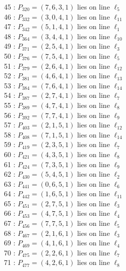 \documentclass{article}
\begin{document}
{\begin{multicols}{2}
45 : $P_{320}=( 7, 6, 3, 1 )$ lies on line $\ell_{5}$\\
46 : $P_{332}=( 3, 0, 4, 1 )$ lies on line $\ell_{11}$\\
47 : $P_{342}=( 5, 1, 4, 1 )$ lies on line $\ell_{1}$\\
48 : $P_{364}=( 3, 4, 4, 1 )$ lies on line $\ell_{10}$\\
49 : $P_{371}=( 2, 5, 4, 1 )$ lies on line $\ell_{3}$\\
50 : $P_{376}=( 7, 5, 4, 1 )$ lies on line $\ell_{5}$\\
51 : $P_{379}=( 2, 6, 4, 1 )$ lies on line $\ell_{12}$\\
52 : $P_{381}=( 4, 6, 4, 1 )$ lies on line $\ell_{13}$\\
53 : $P_{384}=( 7, 6, 4, 1 )$ lies on line $\ell_{14}$\\
54 : $P_{387}=( 2, 7, 4, 1 )$ lies on line $\ell_{7}$\\
55 : $P_{389}=( 4, 7, 4, 1 )$ lies on line $\ell_{8}$\\
56 : $P_{392}=( 7, 7, 4, 1 )$ lies on line $\ell_{9}$\\
57 : $P_{403}=( 2, 1, 5, 1 )$ lies on line $\ell_{12}$\\
58 : $P_{408}=( 7, 1, 5, 1 )$ lies on line $\ell_{14}$\\
59 : $P_{419}=( 2, 3, 5, 1 )$ lies on line $\ell_{7}$\\
60 : $P_{421}=( 4, 3, 5, 1 )$ lies on line $\ell_{8}$\\
61 : $P_{424}=( 7, 3, 5, 1 )$ lies on line $\ell_{9}$\\
62 : $P_{430}=( 5, 4, 5, 1 )$ lies on line $\ell_{2}$\\
63 : $P_{441}=( 0, 6, 5, 1 )$ lies on line $\ell_{6}$\\
64 : $P_{442}=( 1, 6, 5, 1 )$ lies on line $\ell_{11}$\\
65 : $P_{451}=( 2, 7, 5, 1 )$ lies on line $\ell_{3}$\\
66 : $P_{453}=( 4, 7, 5, 1 )$ lies on line $\ell_{4}$\\
67 : $P_{456}=( 7, 7, 5, 1 )$ lies on line $\ell_{5}$\\
68 : $P_{467}=( 2, 1, 6, 1 )$ lies on line $\ell_{3}$\\
69 : $P_{469}=( 4, 1, 6, 1 )$ lies on line $\ell_{4}$\\
70 : $P_{475}=( 2, 2, 6, 1 )$ lies on line $\ell_{7}$\\
71 : $P_{477}=( 4, 2, 6, 1 )$ lies on line $\ell_{8}$\\

\end{multicols}}
\end{document}
